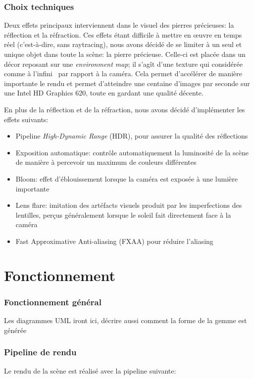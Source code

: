 \documentclass[a4paper,12pt]{article}
\newcommand{\svg}[2][0cm]{
    \begin{figure}[H]
        \centering
        \def\svgwidth{\columnwidth - #1}
        
    \end{figure}
}
\begin{document}
\section{Choix techniques}
Deux effets principaux interviennent dans le visuel des pierres précieuses: la réflection et la réfraction.
Ces effets étant difficile à mettre en œuvre en temps réel (c'est-à-dire, sans raytracing), nous avons décidé
de se limiter à un seul et unique objet dans toute la scène: la pierre précieuse. Celle-ci est placée dans un
décor reposant sur une \emph{environment map}; il s'agît d'une texture qui considérée comme \og à l'infini \fg
\ par rapport à la caméra. Cela permet d'accélérer de manière importante le rendu et permet d'atteindre une
centaine d'images par seconde sur une Intel HD Graphics 620, toute en gardant une qualité décente.

En plus de la réflection et de la réfraction, nous avons décidé d'implémenter les effets suivants:
\begin{itemize}
    \item Pipeline \emph{High-Dynamic Range} (HDR), pour assurer la qualité des réflections
    \item Exposition automatique: contrôle automatiquement la luminosité de la scène de manière à percevoir un maximum de couleurs différentes
    \item Bloom: effet d'éblouissement lorsque la caméra est exposée à une lumière importante
    \item Lens flare: imitation des artéfacts visuels produit par les imperfections des lentilles, perçus généralement lorsque le soleil fait directement face à la caméra
    \item Fast Approximative Anti-aliasing (FXAA) pour réduire \og l'aliasing \fg
\end{itemize}

\part{Fonctionnement}
\section{Fonctionnement général}
Les diagrammes UML iront ici, décrire aussi comment la forme de la gemme est générée

\section{Pipeline de rendu}
Le rendu de la scène est réalisé avec la pipeline suivante:
\svg{PipelineDeRendu}
\end{document}
